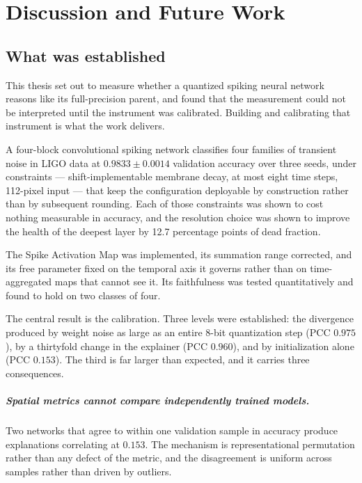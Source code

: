 \chapter{Discussion and Future Work}
\label{ch:conclusions}

\section{What was established}

This thesis set out to measure whether a quantized spiking neural network
reasons like its full-precision parent, and found that the measurement could not
be interpreted until the instrument was calibrated. Building and calibrating that
instrument is what the work delivers.

A four-block convolutional spiking network classifies four families of transient
noise in LIGO data at $0.9833 \pm 0.0014$ validation accuracy over three seeds,
under constraints --- shift-implementable membrane decay, at most eight time
steps, 112-pixel input --- that keep the configuration deployable by
construction rather than by subsequent rounding. Each of those constraints was
shown to cost nothing measurable in accuracy, and the resolution choice was shown
to improve the health of the deepest layer by 12.7 percentage points of dead
fraction.

The Spike Activation Map was implemented, its summation range corrected, and its
free parameter fixed on the temporal axis it governs rather than on
time-aggregated maps that cannot see it. Its faithfulness was tested
quantitatively and found to hold on two classes of four.

The central result is the calibration. Three levels were established: the
divergence produced by weight noise as large as an entire 8-bit quantization step
(PCC $0.975$), by a thirtyfold change in the explainer (PCC $0.960$), and by
initialization alone (PCC $0.153$). The third is far larger than expected, and it
carries three consequences.

\paragraph{Spatial metrics cannot compare independently trained models.} Two
networks that agree to within one validation sample in accuracy produce
explanations correlating at $0.153$. The mechanism is representational
permutation rather than any defect of the metric, and the disagreement is uniform
across samples rather than driven by outliers.

